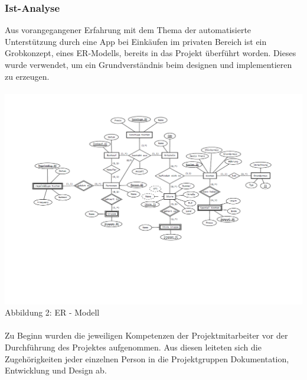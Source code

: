 \documentclass[12pt,a4paper]{article}
\begin{document}
\subsubsection{Ist-Analyse}
Aus vorangegangener Erfahrung mit dem Thema der automatisierte Unterstützung durch eine App bei Einkäufen im privaten Bereich ist ein Grobkonzept, eines ER-Modells, bereits in das Projekt überführt worden. Dieses wurde verwendet, um ein Grundverständnis beim designen und implementieren zu erzeugen. 
\\
\\
\hspace*{-20mm} 
\includegraphics[trim = 15mm 40mm 0mm 20mm, clip, scale=0.7]{ER-Modell.pdf}
\linebreak
\footnotesize Abbildung 2: ER - Modell
\\
\normalsize
\linebreak
\\
Zu Beginn wurden die jeweiligen Kompetenzen der Projektmitarbeiter vor der Durchführung des Projektes aufgenommen. 
Aus diesen leiteten sich die Zugehörigkeiten jeder einzelnen Person in die Projektgruppen Dokumentation, Entwicklung und Design ab. 
\\
\\
\end{document}
